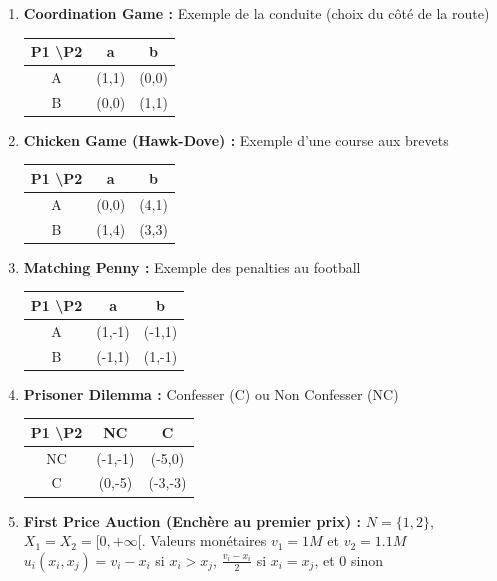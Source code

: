 \begin{enumerate}
    \item \textbf{Coordination Game :} Exemple de la conduite (choix du côté de la route) %
    \begin{center}
    \begin{tabular}{c|c|c}
    P1 \textbackslash P2 & a & b \\ \hline
    A & (1,1) & (0,0) \\ \hline
    B & (0,0) & (1,1)
    \end{tabular} %
    \end{center}

    \item \textbf{Chicken Game (Hawk-Dove) :} Exemple d'une course aux brevets %
    \begin{center}
    \begin{tabular}{c|c|c}
    P1 \textbackslash P2 & a & b \\ \hline
    A & (0,0) & (4,1) \\ \hline
    B & (1,4) & (3,3)
    \end{tabular} %
    \end{center}

    \item \textbf{Matching Penny :} Exemple des penalties au football %
    \begin{center}
    \begin{tabular}{c|c|c}
    P1 \textbackslash P2 & a & b \\ \hline
    A & (1,-1) & (-1,1) \\ \hline
    B & (-1,1) & (1,-1)
    \end{tabular} %
    \end{center}

    \item \textbf{Prisoner Dilemma :} Confesser (C) ou Non Confesser (NC) %
    \begin{center}
    \begin{tabular}{c|c|c}
    P1 \textbackslash P2 & NC & C \\ \hline
    NC & (-1,-1) & (-5,0) \\ \hline
    C & (0,-5) & (-3,-3)
    \end{tabular} %
    \end{center}

    \item \textbf{First Price Auction (Enchère au premier prix) :} %
    $N = \{1, 2\}$, $X_1 = X_2 = [0, +\infty[$. Valeurs monétaires $v_1 = 1M$ et $v_2 = 1.1M$ %
    $u_i(x_i, x_j) = v_i - x_i$ si $x_i > x_j$, $\frac{v_i - x_i}{2}$ si $x_i = x_j$, et $0$ sinon %
\end{enumerate}

